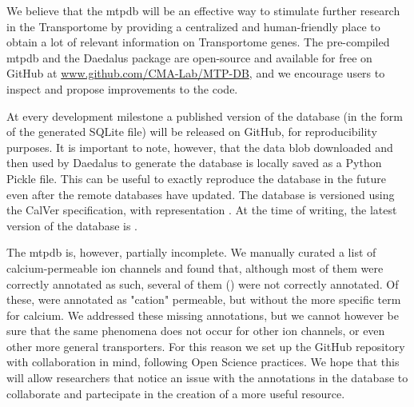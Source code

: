 We believe that the \gls{mtpdb} will be an effective way to stimulate further
research in the Transportome by providing a centralized and human-friendly place
to obtain a lot of relevant information on Transportome genes. The pre-compiled
\gls{mtpdb} and the Daedalus package are open-source and available for free on
GitHub at
\href{https://github.com/CMA-Lab/MTP-DB/}{www.github.com/CMA-Lab/MTP-DB}, and we
encourage users to inspect and propose improvements to the code.

At every development milestone a published version of the database (in the form
of the generated SQLite file) will be released on GitHub, for reproducibility
purposes. It is important to note, however, that the data blob downloaded and
then used by Daedalus to generate the database is locally saved as a Python
Pickle file. This can be useful to exactly reproduce the database in the future
even after the remote databases have updated. The database is versioned using
the CalVer specification, with representation . At
the time of writing, the latest version of the database is .

The \gls{mtpdb} is, however, partially incomplete. We manually curated a list of
 calcium-permeable ion channels and found that, although
most of them were correctly annotated as such, several of them () were not correctly annotated. Of these,  were annotated
as "cation" permeable, but without the more specific term for calcium. We
addressed these missing annotations, but we cannot however be sure that the same
phenomena does not occur for other ion channels, or even other more general
transporters. For this reason we set up the GitHub repository with collaboration
in mind, following Open Science practices. We hope that this will allow
researchers that notice an issue with the annotations in the database to
collaborate and partecipate in the creation of a more useful resource.



